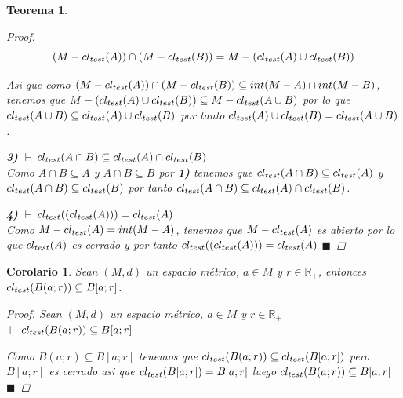 \documentclass[oneside]{book} %
\theoremstyle{Teorema}
\newtheorem{Teorema}[Definicion]{Teorema}
\newtheorem{Corolario}[Definicion]{Corolario}
\theoremstyle{Ejemplos}
\theoremstyle{[Obs]}
\def \test {test}
\newcommand{\cerradura}[2][\test]{\ifx \test #1 {\overline{#2}} \else {cl_{#1}(#2)} \fi} %
\renewcommand{\{}{\left\lbrace} %
\renewcommand{\}}{\right\rbrace} %
\renewcommand{\u}{\cup} %
\newcommand{\n}{\cap} %
\renewcommand{\sc}{\subseteq} %
\newcommand{\R}{\mathbb{R}} %
\renewcommand{\qed}{$\blacksquare$} %
\newcommand{\pd}{$\vdash\ $} %
\begin{document}
\begin{Teorema}
\begin{proof}
					\[ (M - \cerradura{A}) \n (M - \cerradura{B}) = M - (\cerradura{A} \u \cerradura{B}) \]
					
					Asi que como $(M - \cerradura{A}) \n (M - \cerradura{B}) \sc int(M - A) \n int(M - B)$, tenemos que $M - (\cerradura{A} \u \cerradura{B}) \sc M - \cerradura{A \u B}$ por lo que $\cerradura{A \u B} \sc \cerradura{A} \u \cerradura{B}$ por tanto $\cerradura{A} \u \cerradura{B} = \cerradura{A \u B}$.

					\textbf{3)} \pd $\cerradura{A \n B} \sc \cerradura{A} \n \cerradura{B}$ \\ 
					Como $A \n B \sc A$ y $A \n B \sc B$ por \textbf{1)} tenemos que $\cerradura{A \n B} \sc \cerradura{A}$ y $\cerradura{A \n B} \sc \cerradura{B}$ por tanto $\cerradura{A \n B} \sc \cerradura{A} \n \cerradura{B}$. 

					\textbf{4)} \pd $\cerradura{(\cerradura{A})} = \cerradura{A}$ \\ 
					Como $M - \cerradura{A} = int(M - A)$, tenemos que $M - \cerradura{A}$ es abierto por lo que $\cerradura{A}$ es cerrado y por tanto $\cerradura{(\cerradura{A})} = \cerradura{A}$ \qed

				\end{proof}

			\end{Teorema}

			\begin{Corolario}\setlength{\parindent}{0em}

				Sean $(M, d)$ un espacio métrico, $a \in M$ y $r \in \R_{+}$, entonces $\cerradura{B(a;r)} \sc B[a;r]$. 

				\begin{proof}
					
					Sean $(M, d)$ un espacio métrico, $a \in M$ y $r \in \R_{+}$ \\ 
					\pd $\cerradura{B(a;r)} \sc B[a;r]$

					Como $B(a;r) \sc B[a;r]$ tenemos que $\cerradura{B(a;r)} \sc \cerradura{B[a;r]}$ pero $B[a;r]$ es cerrado asi que $\cerradura{B[a;r]} = B[a;r]$ luego $\cerradura{B(a;r)} \sc B[a;r]$ \qed

				\end{proof}

			\end{Corolario}
\end{document}
